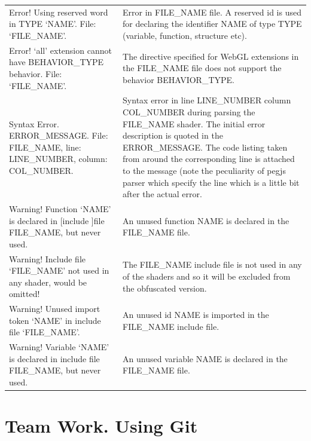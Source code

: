 \documentclass[a4paper,12pt,oneside]{sphinxmanual}
\begin{document}
\begin{tabulary}{\linewidth}{|L|L|}
\hline

Error! Using reserved word in TYPE
`NAME'. File: `FILE\_NAME'.
 & 
Error in FILE\_NAME file. A reserved id is used for declaring the identifier NAME of type TYPE (variable, function, structure etc).
\\

Error! `all' extension cannot have
BEHAVIOR\_TYPE behavior. File:
`FILE\_NAME'.
 & 
The  directive specified for  WebGL extensions in the FILE\_NAME file does not support the behavior BEHAVIOR\_TYPE.
\\

Syntax Error. ERROR\_MESSAGE. File:
FILE\_NAME, line: LINE\_NUMBER,
column: COL\_NUMBER.
 & 
Syntax error in line LINE\_NUMBER column COL\_NUMBER during parsing the FILE\_NAME shader. The initial error description is quoted in the ERROR\_MESSAGE. The code listing taken from around the corresponding line is attached to the message (note the peculiarity of pegjs parser which specify the line which is a little bit after the actual error.
\\

Warning! Function `NAME' is
declared in {[}include {]}file
FILE\_NAME, but never used.
 & 
An unused function NAME is declared in the FILE\_NAME file.
\\

Warning! Include file `FILE\_NAME'
not used in any shader, would be
omitted!
 & 
The FILE\_NAME include file is not used in any of the shaders and so it will be excluded from the obfuscated version.
\\

Warning! Unused import token `NAME'
in include file `FILE\_NAME'.
 & 
An unused id NAME is imported in the FILE\_NAME include file.
\\

Warning! Variable `NAME' is
declared in include file
FILE\_NAME, but never used.
 & 
An unused variable NAME is declared in the FILE\_NAME file.
\\
\hline\end{tabulary}



\chapter{Team Work. Using Git}
\label{git_short_manual:git-short-manual}\label{git_short_manual:index-0}\label{git_short_manual:git}\label{git_short_manual::doc}
\end{document}
